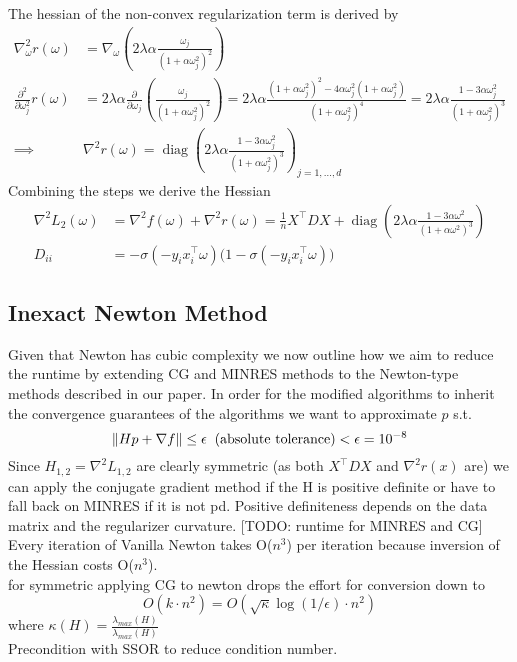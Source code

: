 \documentclass{article}
\begin{document}
%
The hessian of the non-convex regularization term is derived by
\begin{align*}
\nabla ^2 _\omega r(\omega) &= \nabla _\omega \left(2 \lambda \alpha \frac{\omega_j}{(1 + \alpha \omega_j^2)^2} \right)\\
%
\frac{\partial^2}{\partial \omega_j^2} r(\omega) 
&= 2 \lambda \alpha \frac{\partial}{\partial \omega_j} \left( \frac{\omega_j}{(1 + \alpha \omega_j^2)^2} \right)
= 2 \lambda \alpha \frac{(1 + \alpha \omega_j^2)^2 - 4 \alpha \omega_j^2 (1 + \alpha \omega_j^2)}{(1 + \alpha \omega_j^2)^4}
= 2 \lambda \alpha \frac{1 - 3 \alpha \omega_j^2}{(1 + \alpha \omega_j^2)^3} \\
\implies & \nabla^2 r(\omega) = \operatorname{diag}\left(2 \lambda \alpha \frac{1 - 3 \alpha \omega_j^2}{(1 + \alpha \omega_j^2)^3}\right)_{j=1,\ldots,d}
\end{align*}
Combining the steps we derive the Hessian
\begin{align}
\nabla^2 L_2(\omega) &= \nabla^2 f(\omega) + \nabla^2 r(\omega)
= \frac{1}{n} X^\top D X + \operatorname{diag}\left(2 \lambda \alpha \frac{1 - 3 \alpha \omega^2}{(1 + \alpha \omega^2)^3}\right) \\
D_{ii} &= -\sigma(-y_i x_i^\top \omega) \big(1 - \sigma(-y_i x_i^\top \omega)\big)
\end{align}



\subsection{Inexact Newton Method}
Given that Newton has cubic complexity we now outline how we aim to reduce the runtime by extending CG and MINRES methods to the Newton-type methods described in our paper. In order for the modified algorithms to inherit the convergence guarantees of the algorithms we want to approximate $p$ s.t.
$$ \| H p + \nabla f \| \leq \epsilon \hspace{0.2cm} \text{(absolute tolerance)} < \epsilon = 10^{-8} $$
Since $H_{1,2} = \nabla ^2 L_{1,2}$ are clearly symmetric (as both $X^\top D X$ and $\nabla ^2 r(x)$ are) we can apply the conjugate gradient method 
if the H is positive definite or have to fall back on MINRES if it is not pd. Positive definiteness depends on the data matrix and the regularizer curvature.
[TODO: runtime for MINRES and CG]\\
Every iteration of Vanilla Newton takes O($n^3$) per iteration because inversion of the Hessian costs O($n^3$).\\
for symmetric applying CG to newton drops the effort for conversion down to 
$$O(k\cdot n^2) = O(\sqrt{\kappa}\log \left( 1/\epsilon\right) \cdot n^2)$$ where $\kappa(H) = \frac{\lambda_{max}(H)}{\lambda_{max}(H)}$\\
Precondition with SSOR to reduce condition number.


\end{document}
